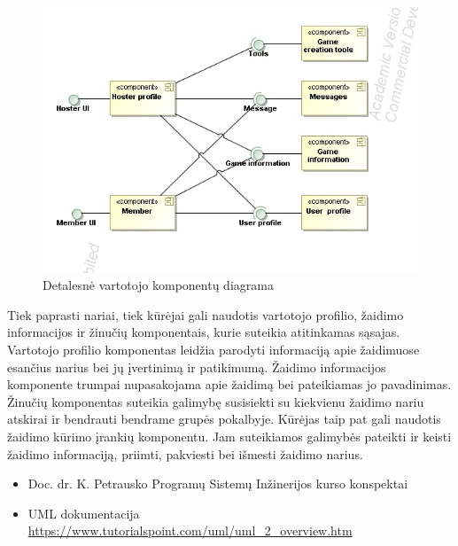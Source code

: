 \documentclass{VUMIFPSkursinis}
\begin{document}
		\begin{figure}[H]
			\centering
			\includegraphics[scale=0.6]{img/UMLComponent3}
			\caption{Detalesnė vartotojo komponentų diagrama}
			\label{img:UMLComponent3}
		\end{figure}
		Tiek paprasti nariai, tiek kūrėjai gali naudotis vartotojo profilio, žaidimo informacijos ir žinučių komponentais, kurie suteikia atitinkamas sąsajas. Vartotojo profilio komponentas leidžia parodyti informaciją apie žaidimuose esančius narius bei jų įvertinimą ir patikimumą. Žaidimo informacijos komponente trumpai nupasakojama apie žaidimą bei pateikiamas jo pavadinimas. Žinučių komponentas suteikia galimybę susisiekti su kiekvienu žaidimo nariu atskirai ir bendrauti bendrame grupės pokalbyje. Kūrėjas taip pat gali naudotis žaidimo kūrimo įrankių komponentu. Jam suteikiamos galimybės pateikti ir keisti žaidimo informaciją, priimti, pakviesti bei išmesti žaidimo narius.


	\begin{itemize}
		\item Doc. dr. K. Petrausko Programų Sistemų Inžinerijos kurso konspektai
		\item UML dokumentacija \url{https://www.tutorialspoint.com/uml/uml_2_overview.htm}
	\end{itemize}
		
\end{document}
